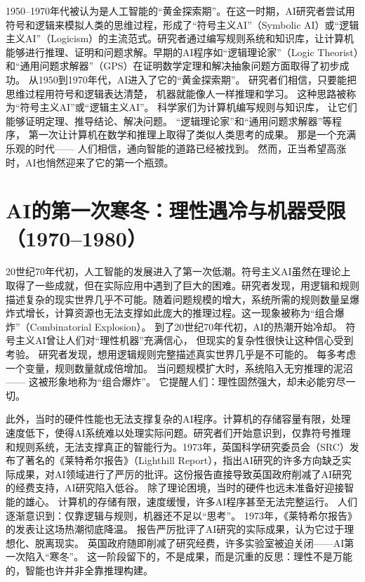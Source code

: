 1950–1970年代被认为是人工智能的“黄金探索期”。在这一时期，AI研究者尝试用符号和逻辑来模拟人类的思维过程，形成了“符号主义AI”（Symbolic AI）或“逻辑主义AI”（Logicism）的主流范式。研究者通过编写规则系统和知识库，让计算机能够进行推理、证明和问题求解。早期的AI程序如“逻辑理论家”（Logic Theorist）和“通用问题求解器”（GPS）在证明数学定理和解决抽象问题方面取得了初步成功。
从1950到1970年代，AI进入了它的“黄金探索期”。  
研究者们相信，只要能把思维过程用符号和逻辑表达清楚，  
机器就能像人一样推理和学习。  
这种思路被称为“符号主义AI”或“逻辑主义AI”。  
科学家们为计算机编写规则与知识库，  
让它们能够证明定理、推导结论、解决问题。  
“逻辑理论家”和“通用问题求解器”等程序，  
第一次让计算机在数学和推理上取得了类似人类思考的成果。  
那是一个充满乐观的时代——  
人们相信，通向智能的道路已经被找到。  
然而，正当希望高涨时，AI也悄然迎来了它的第一个瓶颈。  

\section{AI的第一次寒冬：理性遇冷与机器受限（1970–1980）}

20世纪70年代初，人工智能的发展进入了第一次低潮。符号主义AI虽然在理论上取得了一些成就，但在实际应用中遇到了巨大的困难。研究者发现，用逻辑和规则描述复杂的现实世界几乎不可能。随着问题规模的增大，系统所需的规则数量呈爆炸式增长，计算资源也无法支撑如此庞大的推理过程。这一现象被称为“组合爆炸”（Combinatorial Explosion）。
到了20世纪70年代初，AI的热潮开始冷却。  
符号主义AI曾让人们对“理性机器”充满信心，  
但现实的复杂性很快让这种信心受到考验。  
研究者发现，想用逻辑规则完整描述真实世界几乎是不可能的。  
每多考虑一个变量，规则数量就成倍增加。  
当问题规模扩大时，系统陷入无穷推理的泥沼——  
这被形象地称为“组合爆炸”。  
它提醒人们：理性固然强大，却未必能穷尽一切。  

此外，当时的硬件性能也无法支撑复杂的AI程序。计算机的存储容量有限，处理速度低下，使得AI系统难以处理实际问题。研究者们开始意识到，仅靠符号推理和规则系统，无法支撑真正的智能行为。1973年，英国科学研究委员会（SRC）发布了著名的《莱特希尔报告》（Lighthill Report），指出AI研究的许多方向缺乏实际成果，对AI领域进行了严厉的批评。这份报告直接导致英国政府削减了AI研究的经费支持，AI研究陷入低谷。
除了理论困境，当时的硬件也远未准备好迎接智能的雄心。  
计算机的存储有限，速度缓慢，许多AI程序甚至无法完整运行。  
人们逐渐意识到：仅靠逻辑与规则，机器还不足以“思考”。  
1973年，《莱特希尔报告》的发表让这场热潮彻底降温。  
报告严厉批评了AI研究的实际成果，认为它过于理想化、脱离现实。  
英国政府随即削减了研究经费，许多实验室被迫关闭——AI第一次陷入“寒冬”。  
这一阶段留下的，不是成果，而是沉重的反思：理性不是万能的，智能也许并非全靠推理构建。  

